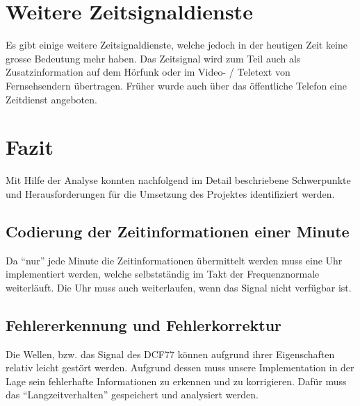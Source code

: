 
\section{Weitere Zeitsignaldienste}
Es gibt einige weitere Zeitsignaldienste, welche jedoch in der heutigen Zeit keine grosse Bedeutung mehr haben. Das Zeitsignal wird zum Teil auch als Zusatzinformation auf dem Hörfunk oder im Video- / Teletext von Fernsehsendern übertragen. Früher wurde auch über das öffentliche Telefon eine Zeitdienst angeboten.

\section{Fazit}
Mit Hilfe der Analyse konnten nachfolgend im Detail beschriebene Schwerpunkte und Herausforderungen für die Umsetzung des Projektes identifiziert werden.

\subsection{Codierung der Zeitinformationen einer Minute}
Da "`nur"' jede Minute die Zeitinformationen übermittelt werden muss eine Uhr implementiert werden, welche selbstständig im Takt der Frequenznormale weiterläuft. Die Uhr muss auch weiterlaufen, wenn das Signal nicht verfügbar ist.

\subsection{Fehlererkennung und Fehlerkorrektur}
Die Wellen, bzw. das Signal des DCF77 können aufgrund ihrer Eigenschaften relativ leicht gestört werden. Aufgrund dessen muss unsere Implementation in der Lage sein fehlerhafte Informationen zu erkennen und zu korrigieren. Dafür muss das "`Langzeitverhalten"' gespeichert und analysiert werden.


